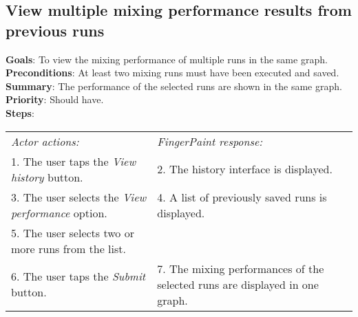 \begin{appendices}
    \section{View multiple mixing performance results from previous runs}
  \textbf{Goals}: To view the mixing performance of multiple runs in the same graph.\\
  \textbf{Preconditions}: At least two mixing runs must have been executed and saved.\\
  \textbf{Summary}: The performance of the selected runs are shown in the same graph.\\
  \textbf{Priority}: Should have.\\
  \textbf{Steps}: \\
  \begin{tabular}{ p{} p{} }
  	\emph{Actor actions:} & \emph{FingerPaint response:} \\
	   1. The user taps the \emph{View history} button. & 2. The history interface is displayed. \\
	 3. The user selects the \emph{View performance} option. & 4. A list of previously saved runs is displayed.\\
	 5. The user selects two or more runs from the list. & \\
	 6. The user taps the \emph{Submit} button. & 7. The mixing performances of the selected runs are displayed in one graph.\\
  \end{tabular}
  
\end{appendices}